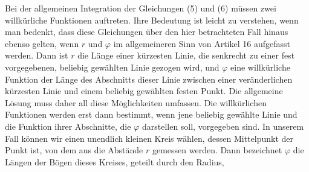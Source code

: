 Bei der allgemeinen Integration der Gleichungen (5) und (6) müssen zwei willkürliche Funktionen auftreten. Ihre Bedeutung ist leicht zu verstehen, wenn man bedenkt, dass diese Gleichungen über den hier betrachteten Fall hinaus ebenso gelten, wenn \(r\) und \(\varphi\) im allgemeineren Sinn von Artikel 16 aufgefasst werden. Dann ist \(r\) die Länge einer kürzesten Linie, die senkrecht zu einer fest vorgegebenen, beliebig gewählten Linie gezogen wird, und \(\varphi\) eine willkürliche Funktion der Länge des Abschnitts dieser Linie zwischen einer veränderlichen kürzesten Linie und einem beliebig gewählten festen Punkt. Die allgemeine Lösung muss daher all diese Möglichkeiten umfassen. Die willkürlichen Funktionen werden erst dann bestimmt, wenn jene beliebig gewählte Linie und die Funktion ihrer Abschnitte, die \(\varphi\) darstellen soll, vorgegeben sind. In unserem Fall können wir einen unendlich kleinen Kreis wählen, dessen Mittelpunkt der Punkt ist, von dem aus die Abstände \(r\) gemessen werden. Dann bezeichnet \(\varphi\) die Längen der Bögen dieses Kreises, geteilt durch den Radius,

